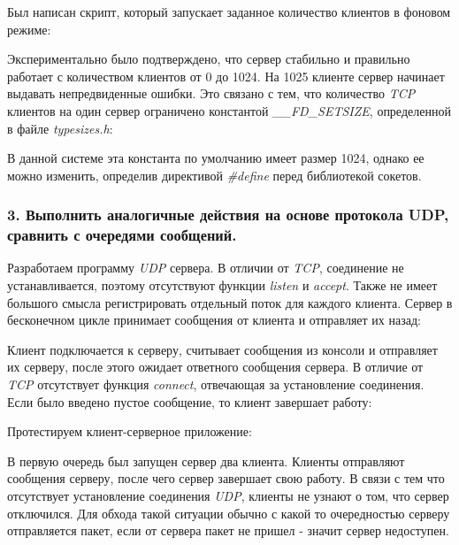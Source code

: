 \documentclass[14pt,a4paper,report]{report}
\begin{document}


Был написан скрипт, который запускает заданное количество клиентов в фоновом режиме:



Экспериментально было подтверждено, что сервер стабильно и правильно работает с количеством клиентов от 0 до 1024. На 1025 клиенте сервер начинает выдавать непредвиденные ошибки. Это связано с тем, что количество \emph{TCP} клиентов на один сервер ограничено константой \emph{\_\_FD\_SETSIZE}, определенной в файле \emph{typesizes.h}:


 
В данной системе эта константа по умолчанию имеет размер 1024, однако ее можно изменить, определив директивой \emph{\#define} перед библиотекой сокетов. 

\subsubsection{3. Выполнить аналогичные действия на основе протокола UDP, сравнить с очередями сообщений.}

Разработаем программу \emph{UDP} сервера. В отличии от \emph{TCP}, соединение не устанавливается, поэтому отсутствуют функции \emph{listen} и \emph{accept}. Также не имеет большого смысла регистрировать отдельный поток для каждого клиента. Сервер в бесконечном цикле принимает сообщения от клиента и отправляет их назад:



Клиент подключается к серверу, считывает сообщения из консоли и отправляет их серверу, после этого ожидает ответного сообщения сервера. В отличие от \emph{TCP} отсутствует функция \emph{connect}, отвечающая за установление соединения. Если было введено пустое сообщение, то клиент завершает работу:



Протестируем клиент-серверное приложение:




В первую очередь был запущен сервер два клиента. Клиенты отправляют сообщения серверу, после чего сервер завершает свою работу. В связи с тем что отсутствует установление соединения \emph{UDP}, клиенты не узнают о том, что сервер отключился. Для обхода такой ситуации обычно с какой то очередностью серверу отправляется пакет, если от сервера пакет не пришел - значит сервер недоступен.
\end{document}
